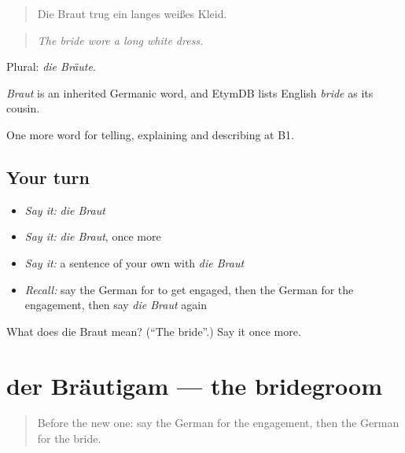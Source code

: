 \begin{quote}
Die Braut trug ein langes weißes Kleid.
\end{quote}

\begin{quote}
\emph{The bride wore a long white dress.}
\end{quote}

Plural: \emph{die Bräute}.

\begin{cousinweb}
\emph{Braut} is an inherited Germanic word, and EtymDB lists English \emph{bride} as its cousin.
\end{cousinweb}

\begin{grammarlens}[title={What you've built}]
One more word for telling, explaining and describing at B1.
\end{grammarlens}

\subsection*{Your turn}
\begin{itemize}
\raggedright
  \item \emph{Say it:} \emph{die Braut}
  \item \emph{Say it:} \emph{die Braut}, once more
  \item \emph{Say it:} a sentence of your own with \emph{die Braut}
  \item \emph{Recall:} say the German for to get engaged, then the German for the engagement, then say \emph{die Braut} again
\end{itemize}

\begin{tcolorbox}[breakable,colback=teal!4,colframe=teal!35!black,title={Before you move on}]
What does die Braut mean? (\textquotedblleft{}The bride\textquotedblright{}.) Say it once more.
\end{tcolorbox}
\section[der Bräutigam]{der Bräutigam — the bridegroom}

\label{lesson:GE-C298-braeutigam}



\begin{quote}
Before the new one: say the German for the engagement, then the German for the bride.
\end{quote}


